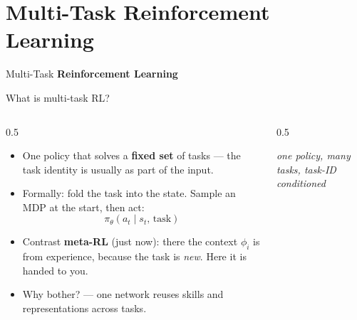 \section{Multi-Task Reinforcement Learning}

\begin{frame}{}
    \LARGE Multi-Task \textbf{Reinforcement Learning}
\end{frame}

\begin{frame}{What is multi-task RL?}
\begin{columns}[c]
\begin{column}{0.5\textwidth}
\begin{itemize}\footnotesize\itemsep0.5em
    \item One policy that solves a \textbf{fixed set} of tasks --- the task identity is
          usually  as part of the input.
    \item Formally: fold the task into the state. Sample an MDP at the start, then act:
          \[ \pi_\theta(a_t \mid s_t,\, \text{task}) \]
    \item Contrast \textbf{meta-RL} (just now): there the context $\phi_i$ is
           from experience, because the task is \emph{new}. Here it is
          handed to you.
    \item Why bother?  --- one network reuses skills and
          representations across tasks.
\end{itemize}
\end{column}
\begin{column}{0.5\textwidth}
\centering
{}
\vspace{0.6em}

{\footnotesize\itshape one policy, many tasks, task-ID conditioned}
\end{column}
\end{columns}
\end{frame}

